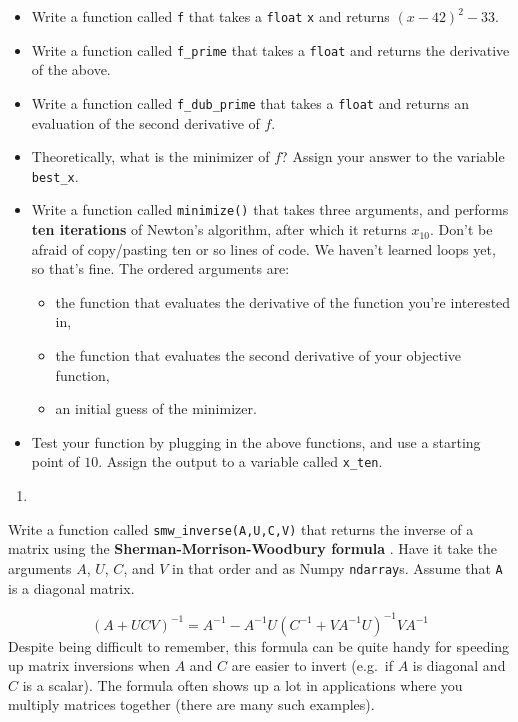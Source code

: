 \documentclass[
  12pt,
  krantz2]{krantz}
\providecommand{\tightlist}{%
  \setlength{\itemsep}{0pt}\setlength{\parskip}{0pt}}
\begin{document}
\begin{itemize}
\tightlist
\item
  Write a function called \texttt{f} that takes a \texttt{float} \texttt{x} and returns \((x-42)^2 - 33\).
\item
  Write a function called \texttt{f\_prime} that takes a \texttt{float} and returns the derivative of the above.
\item
  Write a function called \texttt{f\_dub\_prime} that takes a \texttt{float} and returns an evaluation of the second derivative of \(f\).
\item
  Theoretically, what is the minimizer of \(f\)? Assign your answer to the variable \texttt{best\_x}.
\item
  Write a function called \texttt{minimize()} that takes three arguments, and performs \textbf{ten iterations} of Newton's algorithm, after which it returns \(x_{10}\). Don't be afraid of copy/pasting ten or so lines of code. We haven't learned loops yet, so that's fine. The ordered arguments are:

  \begin{itemize}
  \tightlist
  \item
    the function that evaluates the derivative of the function you're interested in,
  \item
    the function that evaluates the second derivative of your objective function,
  \item
    an initial guess of the minimizer.
  \end{itemize}
\item
  Test your function by plugging in the above functions, and use a starting point of \(10\). Assign the output to a variable called \texttt{x\_ten}.
\end{itemize}

\begin{enumerate}
\def\labelenumi{\arabic{enumi}.}
\setcounter{enumi}{1}
\tightlist
\item
\end{enumerate}

Write a function called \texttt{smw\_inverse(A,U,C,V)} that returns the inverse of a matrix using the \textbf{Sherman-Morrison-Woodbury formula} \citep{woodbury}. Have it take the arguments \(A\), \(U\), \(C\), and \(V\) in that order and as Numpy \texttt{ndarray}s. Assume that \texttt{A} is a diagonal matrix.

\begin{equation} 
(A + UCV)^{-1} = A^{-1} - A^{-1}U(C^{-1} + VA^{-1}U)^{-1}V A^{-1}
\end{equation}
Despite being difficult to remember, this formula can be quite handy for speeding up matrix inversions when \(A\) and \(C\) are easier to invert (e.g.~if \(A\) is diagonal and \(C\) is a scalar). The formula often shows up a lot in applications where you multiply matrices together (there are many such examples).
\end{document}
